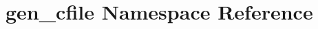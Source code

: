 \hypertarget{namespacegen__cfile}{
\section{gen\_\-cfile Namespace Reference}
\label{namespacegen__cfile}
}


